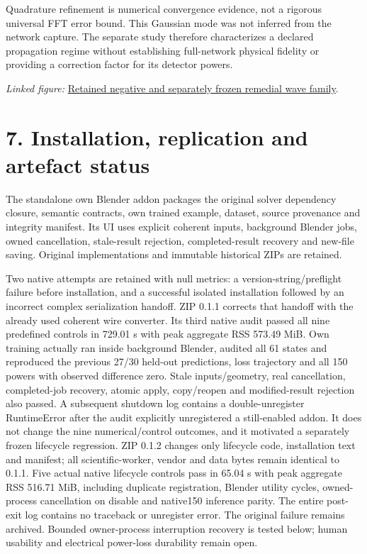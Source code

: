 \documentclass[11pt]{article}
\begin{document}
Quadrature refinement is numerical convergence evidence, not a rigorous universal FFT error bound. This Gaussian mode was not inferred from the network capture. The separate study therefore characterizes a declared propagation regime without establishing full-network physical fidelity or providing a correction factor for its detector powers.

\noindent\textit{Linked figure: }\href{https://github.com/Agnuxo1/Neuro3D/blob/a6d0fbec5011bdc76abad71edac86519016348f4/Docs/assets/gaussian-wave-remedial-2026-10-09.png}{Retained negative and separately frozen remedial wave family}.

\section*{7. Installation, replication and artefact status}

The standalone own Blender addon packages the original solver dependency closure, semantic contracts, own trained example, dataset, source provenance and integrity manifest. Its UI uses explicit coherent inputs, background Blender jobs, owned cancellation, stale-result rejection, completed-result recovery and new-file saving. Original implementations and immutable historical ZIPs are retained.

Two native attempts are retained with null metrics: a version-string/preflight failure before installation, and a successful isolated installation followed by an incorrect complex serialization handoff. ZIP 0.1.1 corrects that handoff with the already used coherent wire converter. Its third native audit passed all nine predefined controls in 729.01 s with peak aggregate RSS 573.49 MiB. Own training actually ran inside background Blender, audited all 61 states and reproduced the previous 27/30 held-out predictions, loss trajectory and all 150 powers with observed difference zero. Stale inputs/geometry, real cancellation, completed-job recovery, atomic apply, copy/reopen and modified-result rejection also passed. A subsequent shutdown log contains a double-unregister RuntimeError after the audit explicitly unregistered a still-enabled addon. It does not change the nine numerical/control outcomes, and it motivated a separately frozen lifecycle regression. ZIP 0.1.2 changes only lifecycle code, installation text and manifest; all scientific-worker, vendor and data bytes remain identical to 0.1.1. Five actual native lifecycle controls pass in 65.04 s with peak aggregate RSS 516.71 MiB, including duplicate registration, Blender utility cycles, owned-process cancellation on disable and native150 inference parity. The entire post-exit log contains no traceback or unregister error. The original failure remains archived. Bounded owner-process interruption recovery is tested below; human usability and electrical power-loss durability remain open.
\end{document}
